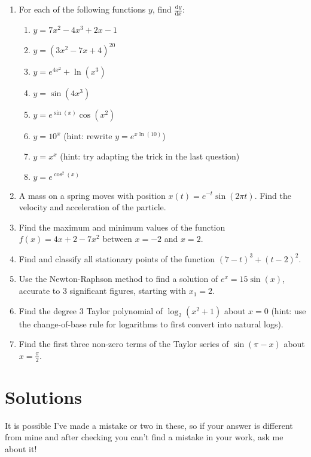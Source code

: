 \documentclass{article}
\newcommand{\deriv}[3][]{\frac{\mathrm{d}^{#1} #2}{\mathrm{d}#3^{#1}}}
\begin{document}
\begin{enumerate}
	\item For each of the following functions $y$, find $\deriv{y}{x}$:
		\begin{enumerate}
			\item $y=7x^2-4x^3+2x-1$
			\item $y=(3x^2-7x+4)^{20}$
			\item $y=e^{4x^2}+\ln(x^3)$
			\item $y=\sin(4x^3)$
			\item $y=e^{\sin(x)}\cos(x^2)$
			\item $y=10^x$ (hint: rewrite $y=e^{x\ln(10)}$)
			\item $y=x^x$ (hint: try adapting the trick in the last question)
			\item $y=e^{\cos^2(x)}$
		\end{enumerate}
	\item A mass on a spring moves with position $x(t)=e^{-t}\sin(2\pi t)$. Find the velocity and acceleration of the particle.
	\item Find the maximum and minimum values of the function $f(x)=4x+2-7x^2$ between $x=-2$ and $x=2$.
	\item Find and classify all stationary points of the function $(7-t)^3+(t-2)^2$.
	\item Use the Newton-Raphson method to find a solution of $e^x=15\sin(x)$, accurate to $3$ significant figures, starting with $x_1=2$.
	\item Find the degree 3 Taylor polynomial of $\log_2(x^2+1)$ about $x=0$ (hint: use the change-of-base rule for logarithms to first convert into natural logs).
	\item Find the first three non-zero terms of the Taylor series of $\sin(\pi-x)$ about $x=\frac{\pi}{2}$.
\end{enumerate}




\clearpage

\section{Solutions}

It is possible I've made a mistake or two in these, so if your answer is different from mine and after checking you can't find a mistake in your work, ask me about it!
\end{document}
